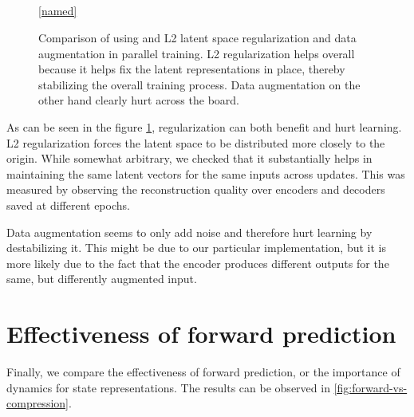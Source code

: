 \begin{figure}[!t]
  \captionsetup[subfloat]{position=top,labelformat=empty}
  \vspace{-1.5cm}
  \centering

    \subfloat[]{  \resizebox{0.4\textwidth}{!}{}}
    \subfloat[]{  \resizebox{0.4\textwidth}{!}{}}\\
  \vspace{-1cm}
    \subfloat[]{  \resizebox{0.4\textwidth}{!}{}}
    \subfloat[]{  \resizebox{0.4\textwidth}{!}{}}\\
  \vspace{-1cm}
    \subfloat[]{  \resizebox{0.4\textwidth}{!}{}}
    \subfloat[]{  \resizebox{0.4\textwidth}{!}{}}\\
  \vspace{-1cm}
    \subfloat[]{  \resizebox{0.4\textwidth}{!}{}}
  \\

  \ref{named}
  \caption{Comparison of using and L2 latent space regularization and data augmentation in parallel training.
  L2 regularization helps overall because it helps fix the latent representations in place, thereby stabilizing
the overall training process. Data augmentation on the other hand clearly hurt across the board.}
  \label{fig:reg-vs-no-reg}
\end{figure}

As can be seen in the figure \ref{fig:reg-vs-no-reg}, regularization can both benefit and hurt learning.
L2 regularization forces the latent space to be distributed more closely to the origin. While somewhat arbitrary,
we checked that it substantially helps in maintaining the same latent vectors for the same inputs
across updates. This was measured by observing the reconstruction quality over encoders and decoders
saved at different epochs.

Data augmentation seems to only add noise and therefore hurt learning by destabilizing it.
This might be due to our particular implementation, but it is more likely due to the fact that 
the encoder produces different outputs for the same, but differently augmented input.


\section{Effectiveness of forward prediction}
\label{sec-effectiveness-of-forward}
Finally, we compare the effectiveness of forward prediction, or
the importance of dynamics for state representations.
The results can be observed in \ref{fig:forward-vs-compression}.

